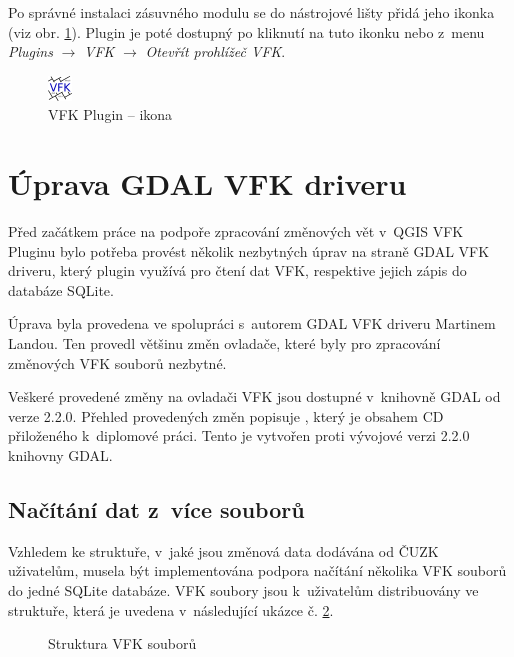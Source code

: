 \documentclass[a4paper,12pt,oneside]{book}
\begin{document}
Po správné instalaci zásuvného modulu se do nástrojové lišty přidá
jeho ikonka (viz obr. \ref{l_plugin_ikona}). Plugin je poté dostupný
po kliknutí na tuto ikonku nebo z~menu \textit{Plugins} $\rightarrow$
\textit{VFK} $\rightarrow$ \textit{Otevřít prohlížeč VFK}.

\begin{figure}[H]
\centering
\includegraphics[scale=0.9]{images/vfkPluginIcon.png}
\caption[VFK Plugin -- ikona]{VFK Plugin -- ikona}
\label{l_plugin_ikona}
\end{figure}


\section{Úprava GDAL VFK driveru}
\label{l_uprava_gdal}
Před začátkem práce na podpoře zpracování změnových vět v~QGIS VFK
Pluginu bylo potřeba provést několik nezbytných úprav na straně GDAL
VFK driveru, který plugin využívá pro čtení dat VFK, respektive jejich
zápis do databáze SQLite.

Úprava byla provedena ve spolupráci s~autorem GDAL VFK driveru
Martinem Landou. Ten provedl většinu změn ovladače, které byly pro
zpracování změnových VFK souborů nezbytné.

Veškeré provedené změny na ovladači VFK jsou dostupné v~knihovně GDAL
od verze 2.2.0. Přehled provedených změn popisuje ,
který je obsahem CD přiloženého k~diplomové práci. Tento  je
vytvořen proti vývojové verzi 2.2.0 knihovny GDAL.

\subsection{Načítání dat z~více souborů}
Vzhledem ke struktuře, v~jaké jsou změnová data dodávána od ČUZK
uživatelům, musela být implementována podpora načítání několika VFK
souborů do jedné SQLite databáze. VFK soubory jsou k~uživatelům
distribuovány ve struktuře, která je uvedena v~následující ukázce
č. \ref{l_struktura_sireni_vfk}.

\begin{figure}[htb]
\centering
\begin{minipage}{0.9\textwidth}
\end{minipage}
\caption{Struktura VFK souborů}
\label{l_struktura_sireni_vfk}
\end{figure}
\end{document}
